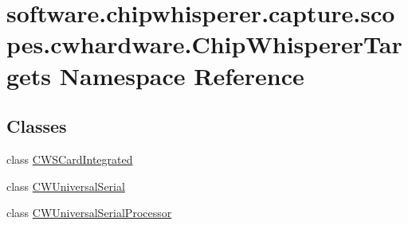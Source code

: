 \hypertarget{namespacesoftware_1_1chipwhisperer_1_1capture_1_1scopes_1_1cwhardware_1_1ChipWhispererTargets}{}\section{software.\+chipwhisperer.\+capture.\+scopes.\+cwhardware.\+Chip\+Whisperer\+Targets Namespace Reference}
\label{namespacesoftware_1_1chipwhisperer_1_1capture_1_1scopes_1_1cwhardware_1_1ChipWhispererTargets}
\subsection*{Classes}
\begin{DoxyCompactItemize}
\item 
class \hyperlink{classsoftware_1_1chipwhisperer_1_1capture_1_1scopes_1_1cwhardware_1_1ChipWhispererTargets_1_1CWSCardIntegrated}{C\+W\+S\+Card\+Integrated}
\item 
class \hyperlink{classsoftware_1_1chipwhisperer_1_1capture_1_1scopes_1_1cwhardware_1_1ChipWhispererTargets_1_1CWUniversalSerial}{C\+W\+Universal\+Serial}
\item 
class \hyperlink{classsoftware_1_1chipwhisperer_1_1capture_1_1scopes_1_1cwhardware_1_1ChipWhispererTargets_1_1CWUniversalSerialProcessor}{C\+W\+Universal\+Serial\+Processor}
\end{DoxyCompactItemize}
